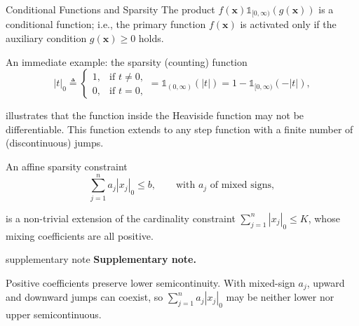 \documentclass[aspectratio=169,xcolor=dvipsnames]{beamer}
\newenvironment{supplementarynote}{%
  \vspace{0.08cm}%
  \begin{beamercolorbox}[
    wd=\textwidth,sep=0.08cm,leftskip=0.08cm,rightskip=0.08cm
  ]{supplementary note}%
  \footnotesize
  \textcolor{SupplementAccent}{\textbf{Supplementary note.}}\enspace
}{%
  \end{beamercolorbox}%
}
\begin{document}
\begin{frame}{Conditional Functions and Sparsity}
  \small
  \setlength{\abovedisplayskip}{4pt}
  \setlength{\belowdisplayskip}{4pt}
  \setlength{\abovedisplayshortskip}{3pt}
  \setlength{\belowdisplayshortskip}{3pt}
  The product
  $f(\mathbf{x})\mathds{1}_{[0,\infty)}\!\left(g(\mathbf{x})\right)$
  is a conditional function; i.e., the primary function $f(\mathbf{x})$ is
  activated only if the auxiliary condition $g(\mathbf{x})\geq 0$ holds.

  \vspace{0.12cm}
  {\color{MediumBlue}An immediate example: the sparsity (counting) function}
  \vspace{-0.04cm}
  \[
    |t|_0\triangleq
    \begin{cases}
      1, & \text{if }t\neq 0,\\
      0, & \text{if }t=0,
    \end{cases}
    =\mathds{1}_{(0,\infty)}(|t|)
    =1-\mathds{1}_{[0,\infty)}(-|t|),
  \]
  \vspace{-0.08cm}

  illustrates that the function inside the Heaviside function may not be
  differentiable. This function extends to any step function with a finite
  number of (discontinuous) jumps.

  \vspace{0.14cm}
  An \textcolor{MediumRed}{affine sparsity} constraint
  \vspace{-0.05cm}
  \[
    \sum_{j=1}^{n}a_j|x_j|_0\leq b,
    \qquad \text{with $a_j$ of mixed signs},
  \]
  \vspace{-0.08cm}

  is a non-trivial extension of the cardinality constraint
  $\sum_{j=1}^{n}|x_j|_0\leq K$, whose mixing coefficients are all positive.

  \begin{supplementarynote}
    Positive coefficients preserve lower semicontinuity. With mixed-sign
    $a_j$, upward and downward jumps can coexist, so
    $\sum_{j=1}^{n}a_j|x_j|_0$ may be neither lower nor upper
    semicontinuous.
  \end{supplementarynote}
\end{frame}
\end{document}
